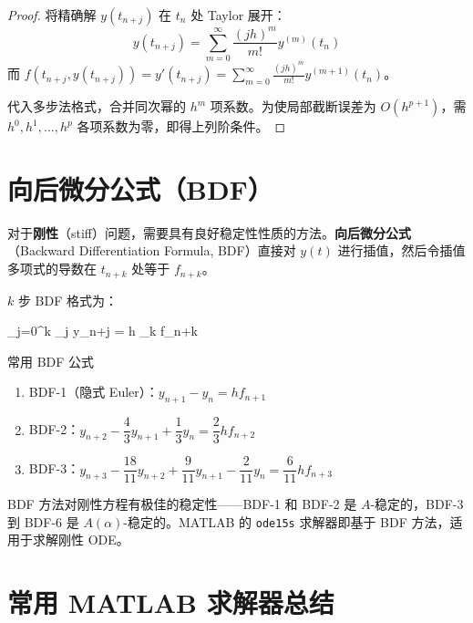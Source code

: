 \begin{proof}
	将精确解 $y(t_{n+j})$ 在 $t_n$ 处 Taylor 展开：
	\[
	y(t_{n+j}) = \sum_{m=0}^{\infty} \frac{(jh)^m}{m!} y^{(m)}(t_n)
	\]
	而 $f(t_{n+j}, y(t_{n+j})) = y'(t_{n+j}) = \sum_{m=0}^{\infty} \frac{(jh)^m}{m!} y^{(m+1)}(t_n)$。
	
	代入多步法格式，合并同次幂的 $h^m$ 项系数。为使局部截断误差为 $O(h^{p+1})$，需 $h^0, h^1, \ldots, h^p$ 各项系数为零，即得上列阶条件。
\end{proof}

\section{向后微分公式（BDF）}

对于\textbf{刚性}（stiff）问题，需要具有良好稳定性性质的方法。\textbf{向后微分公式}（Backward Differentiation Formula, BDF）直接对 $y(t)$ 进行插值，然后令插值多项式的导数在 $t_{n+k}$ 处等于 $f_{n+k}$。

$k$ 步 BDF 格式为：
\begin{myformula}
	\sum_{j=0}^{k} \alpha_j y_{n+j} = h \beta_k f_{n+k}
\end{myformula}

\begin{myTheorem}{常用 BDF 公式}
	\begin{enumerate}
		\item BDF-1（隐式 Euler）：$y_{n+1} - y_n = h f_{n+1}$
		\item BDF-2：$y_{n+2} - \dfrac{4}{3} y_{n+1} + \dfrac{1}{3} y_n = \dfrac{2}{3} h f_{n+2}$
		\item BDF-3：$y_{n+3} - \dfrac{18}{11} y_{n+2} + \dfrac{9}{11} y_{n+1} - \dfrac{2}{11} y_n = \dfrac{6}{11} h f_{n+3}$
	\end{enumerate}
\end{myTheorem}

\begin{remark}
	BDF 方法对刚性方程有极佳的稳定性——BDF-1 和 BDF-2 是 $A$-稳定的，BDF-3 到 BDF-6 是 $A(\alpha)$-稳定的。MATLAB 的 \texttt{ode15s} 求解器即基于 BDF 方法，适用于求解刚性 ODE。
\end{remark}

\section{常用 MATLAB 求解器总结}

